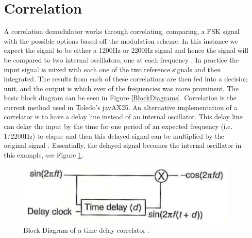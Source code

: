 \section{Correlation}
A correlation demodulator works through correlating, comparing, a FSK signal with the possible options based off the modulation scheme. In this instance we expect the signal to be either a 1200Hz or 2200Hz signal and hence the signal will be compared to two internal oscillators, one at each frequency \cite{Rowe2014}. In practice the input signal is mixed with each one of the two reference signals and then integrated. The results from each of these correlations are then fed into a decision unit, and the output is which ever of the frequencies was more prominent. The basic block diagram can be seen in Figure \ref{BlockDiagrams}. Correlation is the current method used in Toledo's javAX25. An alternative implementation of a correlator is to have a delay line instead of an internal oscillator. This delay line can delay the input by the time for one period of an expected frequency (i.e. 1/2200Hz) to elapse and then this delayed signal can be multiplied by the original signal \cite{Seguine2006}. Essentially, the delayed signal becomes the internal oscillator in this example, see Figure \ref{TimeDelayCorrelator}. 

\begin{figure}
  \centering
	\includegraphics[width=0.75\linewidth]{images/TimeDelayCorrelator.png} 
	\caption{Block Diagram of a time delay correlator \cite{Seguine2006}.}
   \label{TimeDelayCorrelator}
\end{figure}

